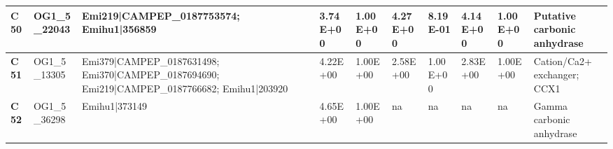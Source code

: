 \begin{landscape}
\begin{center}
\begin{footnotesize}
\begin{longtable}{|p{0.5cm}|p{1.5cm}|p{4cm}|l|l|l|l|l|l|l|}
\textbf{C50} & OG1\_5\_22043 & Emi219|CAMPEP\_0187753574; Emihu1|356859                                                                                                                                                                                                                                                                                                                                                                                                                                                                                                                                                                                                 & 3.74E+00  & 1.00E+00 & 4.27E+00  & 8.19E-01 & 4.14E+00  & 1.00E+00 & Putative carbonic anhydrase                                                  \\ \hline
\textbf{C51} & OG1\_5\_13305 & Emi379|CAMPEP\_0187631498; Emi370|CAMPEP\_0187694690; Emi219|CAMPEP\_0187766682; Emihu1|203920                                                                                                                                                                                                                                                                                                                                                                                                                                                                                                                                           & 4.22E+00  & 1.00E+00 & 2.58E+00  & 1.00E+00 & 2.83E+00  & 1.00E+00 & Cation/Ca2+ exchanger; CCX1                                                  \\ \hline
\textbf{C52} & OG1\_5\_36298 & Emihu1|373149                                                                                                                                                                                                                                                                                                                                                                                                                                                                                                                                                                                                                            & 4.65E+00  & 1.00E+00 & na        & na       & na        & na       & Gamma carbonic anhydrase                                                     \\ \hline

\end{longtable}
\end{footnotesize}
\end{center}
\end{landscape}
